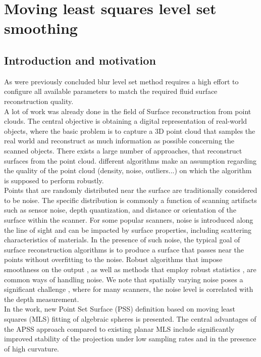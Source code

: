 \chapter{Moving least squares level set smoothing} \label{sec:mls}
\section{Introduction and motivation}
As were previously concluded blur level set method requires a high effort to configure all available parameters to match the required fluid surface reconstruction quality.\\
A lot of work was already done in the field of Surface reconstruction from point clouds. 
The central objective is obtaining a digital representation of real-world objects, where the basic problem is to capture a 3D point cloud that samples the real world and reconstruct as much information as possible concerning the scanned objects. There exists a large number of approaches, that reconstruct surfaces from the point cloud. different algorithms make an assumption regarding the quality of the point cloud (density, noise, outliers...) on which the algorithm is supposed to perform robustly.\\
Points that are randomly distributed near the surface are traditionally considered to be noise. The specific distribution is commonly a function of scanning artifacts such as sensor noise, depth quantization, and distance or orientation of the surface within the scanner. For some popular scanners, noise is introduced along the line of sight and can be impacted by surface properties, including scattering characteristics of materials. In the presence of such noise, the typical goal of surface reconstruction algorithms is to produce a surface that passes near the points without overfitting to the noise. Robust algorithms that impose smoothness on the output \cite{PSR}, as well as methods that employ robust statistics \cite{FPPSKR}, are common ways of handling noise. We note that spatially varying noise poses a significant challenge \cite{NSRFRPS}, where for many scanners, the noise level is correlated with the depth measurement.\\
In the work, \cite{Apss} new Point Set Surface (PSS) definition based on moving least squares (MLS) fitting of algebraic spheres is presented. The central advantages of the APSS approach compared to existing planar MLS include significantly improved stability of the projection under low sampling rates and in the presence of high curvature.\\
